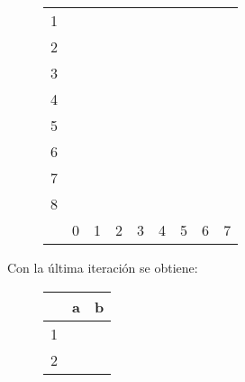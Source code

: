 \documentclass[11pt,a4paper]{article}
\begin{document}
		\begin{figure}[H]
			\centering
			\begin{tabular}{*{9}{c|}}
																							\cline{2-2}
				1 & \color{blue}{X}															\\ \cline{2-3}
				2 & \color{blue}{X} &														\\ \cline{2-4}
				3 & \color{blue}{X} & \color{red}{X} &	\color{red}{X} 						\\ \cline{2-5}
				4 & \color{red}{X} & \color{blue}{X} & \color{blue}{X} & \color{blue}{X}	\\ \cline{2-6}
				5 & \color{red}{X} & \color{blue}{X} & \color{blue}{X} & \color{blue}{X} & \color{red}{X} \\ \cline{2-7}
				6 & \color{red}{X} & \color{blue}{X} & \color{blue}{X} & \color{blue}{X} &
				  & \color{red}{X} \\ \cline{2-8}
				7 & \color{red}{X} & \color{blue}{X} & \color{blue}{X} & \color{blue}{X} & \color{red}{X} & 
				  & \color{red}{X} \\ \cline{2-9}
				8 & \color{blue}{X} & \color{red}{X} & \color{red}{X} & \color{red}{X} & \color{blue}{X} & \color{blue}{X} &
					\color{blue}{X} & \color{blue}{X} \\ \cline{2-9}
				\multicolumn{0}{c}{} & \multicolumn{1}{c}{0} & \multicolumn{1}{c}{1} & \multicolumn{1}{c}{2}
				& \multicolumn{1}{c}{3} & \multicolumn{1}{c}{4} & \multicolumn{1}{c}{5} & \multicolumn{1}{c}{6}
				& \multicolumn{1}{c}{7}
			\end{tabular}
		\end{figure}
		
		Con la última iteración se obtiene:
		
		\begin{figure}[H]
			\centering
			\begin{tabular}{c|cc}
				& a & b		\\ \hline
				1 & \color{red}{8} & \color{red}{2}	\\
				2 & \color{red}{0} & \color{red}{8}	\\ \hline
			\end{tabular}
		\end{figure}
		
\end{document}
